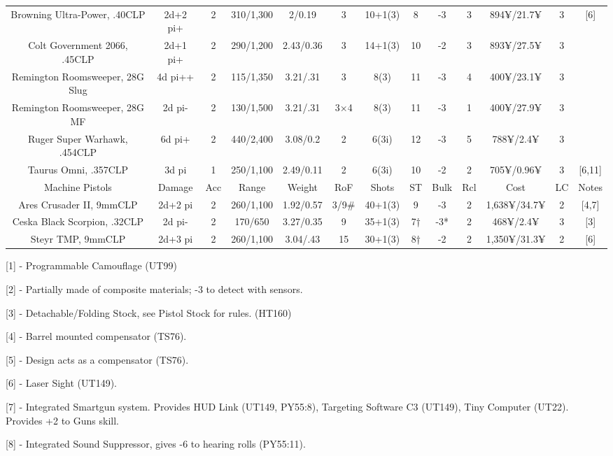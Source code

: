 \begin{center}
\begin{adjustwidth}{-8mm}{}
{\begin{tabular}{|c|c|c|c|c|c|c|c|c|c|c|c|c|}
				Browning Ultra-Power, .40CLP & 2d+2 pi+ & 2 & 310/1,300 & 2/0.19 & 3 & 10+1(3) & 8 & -3 & 3 & 894¥/21.7¥ & 3 & [6] \\
				Colt Government 2066, .45CLP & 2d+1 pi+ & 2 & 290/1,200 & 2.43/0.36 & 3 & 14+1(3) & 10 & -2 & 3 & 893¥/27.5¥ & 3  &\\
				Remington Roomsweeper, 28G Slug & 4d pi++ & 2 & 115/1,350 & 3.21/.31 & 3 & 8(3) & 11 & -3 & 4 & 400¥/23.1¥ & 3  & \\
				Remington Roomsweeper, 28G MF & 2d pi- & 2 & 130/1,500 & 3.21/.31 & 3×4 & 8(3) & 11 & -3 & 1 & 400¥/27.9¥ & 3 &	\\
				Ruger Super Warhawk, .454CLP & 6d pi+ & 2 & 440/2,400 & 3.08/0.2 & 2 & 6(3i) & 12 & -3 & 5 & 788¥/2.4¥ & 3 	&\\
				Taurus Omni, .357CLP  & 3d pi & 1 & 250/1,100 & 2.49/0.11 & 2 & 6(3i) & 10 & -2 & 2 & 705¥/0.96¥ & 3 & [6,11]\\
				\hline
				Machine Pistols & Damage & Acc & Range & Weight & RoF & Shots & ST & Bulk & Rcl & Cost & LC & Notes\\
				\hline
				Ares Crusader II, 9mmCLP & 2d+2 pi & 2 & 260/1,100 & 1.92/0.57 & 3/9\# & 40+1(3) & 9 & -3 & 2 & 1,638¥/34.7¥ & 2 & [4,7] \\
				Ceska Black Scorpion, .32CLP & 2d pi- & 2 & 170/650 & 3.27/0.35 & 9 & 35+1(3) & 7† & -3* & 2 & 468¥/2.4¥ & 3 & [3] \\
				Steyr TMP, 9mmCLP & 2d+3 pi & 2 & 260/1,100 & 3.04/.43 & 15 & 30+1(3) & 8† & -2 & 2 & 1,350¥/31.3¥ & 2 & [6] \\
				\hline
			\end{tabular}
		}
	\end{adjustwidth}
\end{center}

[1] - Programmable Camouflage (UT99)

[2] - Partially made of composite materials; -3 to detect with sensors.

[3] - Detachable/Folding Stock, see Pistol Stock for rules. (HT160)

[4] - Barrel mounted compensator (TS76).

[5] - Design acts as a compensator (TS76).

[6] - Laser Sight (UT149).

[7] - Integrated Smartgun system. Provides HUD Link (UT149, PY55:8), Targeting Software C3 (UT149), Tiny Computer (UT22). Provides +2 to Guns skill.

[8] - Integrated Sound Suppressor, gives -6 to hearing rolls (PY55:11).

